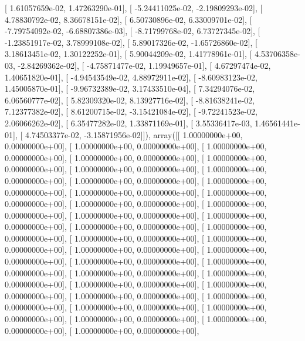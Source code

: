 \documentclass{article}
\begin{document}
       [  1.61057659e-02,   1.47263290e-01],
       [ -5.24411025e-02,  -2.19809293e-02],
       [  4.78830792e-02,   8.36678151e-02],
       [  6.50730896e-02,   6.33009701e-02],
       [ -7.79754092e-02,  -6.68807386e-03],
       [ -8.71799768e-02,   6.73727345e-02],
       [ -1.23851917e-02,   3.78999108e-02],
       [  5.89017326e-02,  -1.65726860e-02],
       [  3.18613451e-02,   1.30122252e-01],
       [  5.90044209e-02,   1.41778961e-01],
       [  4.53706358e-03,  -2.84269362e-02],
       [ -4.75871477e-02,   1.19949657e-01],
       [  4.67297474e-02,   1.40651820e-01],
       [ -4.94543549e-02,   4.88972911e-02],
       [ -8.60983123e-02,   1.45005870e-01],
       [ -9.96732389e-02,   3.17433510e-04],
       [  7.34294076e-02,   6.06560777e-02],
       [  5.82309320e-02,   8.13927716e-02],
       [ -8.81638241e-02,   7.12377382e-02],
       [  8.61200715e-02,  -3.15421084e-02],
       [ -9.72241523e-02,   2.06066262e-02],
       [  6.35477282e-02,   1.33871169e-01],
       [  3.55336417e-03,   1.46561441e-01],
       [  4.74503377e-02,  -3.15871956e-02]]), array([[  1.00000000e+00,   0.00000000e+00],
       [  1.00000000e+00,   0.00000000e+00],
       [  1.00000000e+00,   0.00000000e+00],
       [  1.00000000e+00,   0.00000000e+00],
       [  1.00000000e+00,   0.00000000e+00],
       [  1.00000000e+00,   0.00000000e+00],
       [  1.00000000e+00,   0.00000000e+00],
       [  1.00000000e+00,   0.00000000e+00],
       [  1.00000000e+00,   0.00000000e+00],
       [  1.00000000e+00,   0.00000000e+00],
       [  1.00000000e+00,   0.00000000e+00],
       [  1.00000000e+00,   0.00000000e+00],
       [  1.00000000e+00,   0.00000000e+00],
       [  1.00000000e+00,   0.00000000e+00],
       [  1.00000000e+00,   0.00000000e+00],
       [  1.00000000e+00,   0.00000000e+00],
       [  1.00000000e+00,   0.00000000e+00],
       [  1.00000000e+00,   0.00000000e+00],
       [  1.00000000e+00,   0.00000000e+00],
       [  1.00000000e+00,   0.00000000e+00],
       [  1.00000000e+00,   0.00000000e+00],
       [  1.00000000e+00,   0.00000000e+00],
       [  1.00000000e+00,   0.00000000e+00],
       [  1.00000000e+00,   0.00000000e+00],
       [  1.00000000e+00,   0.00000000e+00],
       [  1.00000000e+00,   0.00000000e+00],
       [  1.00000000e+00,   0.00000000e+00],
       [  1.00000000e+00,   0.00000000e+00],
       [  1.00000000e+00,   0.00000000e+00],
       [  1.00000000e+00,   0.00000000e+00],
       [  1.00000000e+00,   0.00000000e+00],
       [  1.00000000e+00,   0.00000000e+00],
       [  1.00000000e+00,   0.00000000e+00],
       [  1.00000000e+00,   0.00000000e+00],
\end{document}
